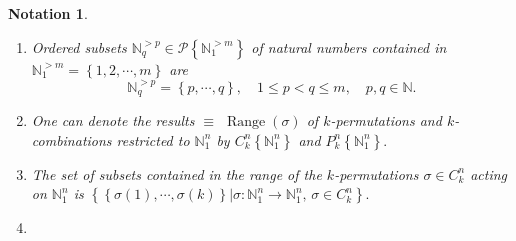 \documentclass[aps,preprint]{revtex4}%
\newtheorem{notation}[theorem]{Notation}
\begin{document}
\begin{notation}
\begin{enumerate}
\begin{enumerate}
\item The group action of $S_{m}$ on $\mathbb{N}^{m}$ is given by
\begin{equation}
\left(  \sigma_{1}\sigma_{2}\right)  \left(  \left\{  n_{1},\cdots
,n_{m}\right\}  \right)  =\sigma_{1}\left\{  \sigma_{2}\left(  n_{1}\right)
,\cdots,\sigma_{2}\left(  n_{m}\right)  \right\}  =\left\{  n_{\left(
\sigma_{1}\sigma_{2}\right)  \left(  1\right)  },\cdots,n_{\left(  \sigma
_{1}\sigma_{2}\right)  \left(  m\right)  }\right\}  .
\end{equation}

\end{enumerate}

\item Ordered subsets $\mathbb{N}_{q}^{>p}\in\mathcal{P}\left\{
\mathbb{N}_{1}^{>m}\right\}  $ of natural numbers contained in $\mathbb{N}%
_{1}^{>m}=\left\{  1,2,\cdots,m\right\}  $ are
\begin{equation}
\mathbb{N}_{q}^{>p}=\left\{  p,\cdots,q\right\}  ,\quad1\leq p<q\leq m,\quad
p,q\in\mathbb{N}.
\end{equation}


\item One can denote \emph{the results }$\equiv$ $\operatorname*{Range}\left(
\sigma\right)  $ of $k$-permutations and $k$-combinations restricted to
$\mathbb{N}_{1}^{n}$ by $C_{k}^{n}\left\{  \mathbb{N}_{1}^{n}\right\}  $ and
$P_{k}^{n}\left\{  \mathbb{N}_{1}^{n}\right\}  .$

\item The set of subsets contained in the \emph{range} of the $k$-permutations
$\sigma\in C_{k}^{n}$ acting on $\mathbb{N}_{1}^{n}$ is $\left\{  \left.
\left\{  \sigma\left(  1\right)  ,\cdots,\sigma\left(  k\right)  \right\}
\right\vert \sigma:\mathbb{N}_{1}^{n}\rightarrow\mathbb{N}_{1}^{n},\,\sigma\in
C_{k}^{n}\right\}  .$

\item \label{Disjoint Combinations}


\end{enumerate}
\end{notation}
\end{document}
